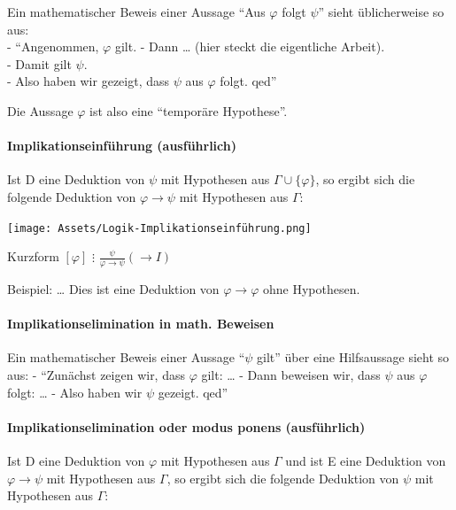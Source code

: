 \documentclass[a4paper]{article}
\begin{document}
\begin{multicols}{3}
  Ein mathematischer Beweis einer Aussage ``Aus $\varphi$ folgt $\psi$''
  sieht üblicherweise so aus:\\- ``Angenommen, $\varphi$ gilt. - Dann
  \ldots{} (hier steckt die eigentliche Arbeit).\\- Damit gilt $\psi$.\\-
  Also haben wir gezeigt, dass $\psi$ aus $\varphi$ folgt. qed''

  Die Aussage $\varphi$ ist also eine ``temporäre Hypothese''.

  \paragraph{Implikationseinführung
    (ausführlich)}\label{implikationseinfuxfchrung-ausfuxfchrlich}

  Ist D eine Deduktion von $\psi$ mit Hypothesen aus
  $\Gamma\cup\{\varphi\}$, so ergibt sich die folgende Deduktion von
  $\varphi\rightarrow\psi$ mit Hypothesen aus $\Gamma$:


  \texttt{[image: Assets/Logik-Implikationseinführung.png]}

  Kurzform $[\varphi]$ $\vdots$
  $\frac{\psi}{\varphi\rightarrow\psi} (\rightarrow I)$

  Beispiel: \ldots{} Dies ist eine Deduktion von
  $\varphi\rightarrow\varphi$ ohne Hypothesen.

  \paragraph{Implikationselimination in math.
    Beweisen}\label{implikationselimination-in-math.-beweisen}

  Ein mathematischer Beweis einer Aussage ``$\psi$ gilt'' über eine
  Hilfsaussage sieht so aus: - ``Zunächst zeigen wir, dass $\varphi$ gilt:
  \ldots{} - Dann beweisen wir, dass $\psi$ aus $\varphi$ folgt: \ldots{}
  - Also haben wir $\psi$ gezeigt. qed''

  \paragraph{Implikationselimination oder modus ponens
    (ausführlich)}\label{implikationselimination-oder-modus-ponens-ausfuxfchrlich}

  Ist D eine Deduktion von $\varphi$ mit Hypothesen aus $\Gamma$ und ist E
  eine Deduktion von $\varphi\rightarrow\psi$ mit Hypothesen aus $\Gamma$,
  so ergibt sich die folgende Deduktion von $\psi$ mit Hypothesen aus
  $\Gamma$:



\end{multicols}
\end{document}
